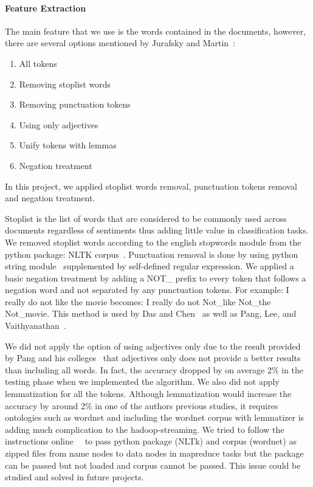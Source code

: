 \paragraph{Feature Extraction}
The main feature that we use is the words contained in the documents,
however, there are several options mentioned by Jurafsky and
Martin~\cite{hid-sp18-405-sentiment-jurafsky2009}:
\begin{enumerate}
	\item All tokens
	\item Removing stoplist words
	\item Removing punctuation tokens
	\item Using only adjectives
	\item Unify tokens with lemmas
	\item Negation treatment
\end{enumerate}
In this project, we applied stoplist words removal, punctuation tokens 
removal and negation treatment. 

Stoplist is the list of words that are considered to be commonly used
across documents regardless of sentiments thus adding little value in
classification tasks. We removed stoplist words according to the
english stopwords module from the python package: NLTK
corpus~\cite{hid-sp18-405-sentiment-stopworddoc}. Punctuation removal
is done by using python string
module~\cite{hid-sp18-405-sentiment-punctuationdoc} supplemented by
self-defined regular expression. We applied a basic negation treatment
by adding a NOT\_ prefix to every token that follows a negation word
and not separated by any punctuation tokens. For example: I really do
not like the movie becomes: I really do not Not\_like Not\_the
Not\_movie. This method is used by Das and
Chen~\cite{hid-sp18-405-sentiment-das2001yahoo} as well as Pang, Lee,
and Vaithyanathan~\cite{hid-sp18-405-sentiment-pang2002thumbs}.

We did not apply the option of using adjectives only due to the result
provided by Pang and his
colleges~\cite{hid-sp18-405-sentiment-pang2004asentimental} that
adjectives only does not provide a better results than including all
words. In fact, the accuracy dropped by on average 2\% in the testing
phase when we implemented the algorithm. We also did not apply
lemmatization for all the tokens. Although lemmatization would
increase the accuracy by around 2\% in one of the authors previous
studies, it requires ontologies such as wordnet and including the
wordnet corpus with lemmatizer is adding much complication to the
hadoop-streaming. We tried to follow the instructions
online~\cite{hid-sp18-405-hadoopstreaming-nltk}~\cite{hid-sp18-405-hadoopstreaming-corpus}
to pass python package (NLTk) and corpus (wordnet) as zipped files
from name nodes to data nodes in mapreduce tasks but the package can
be passed but not loaded and corpus cannot be passed. This issue could
be studied and solved in future projects.

